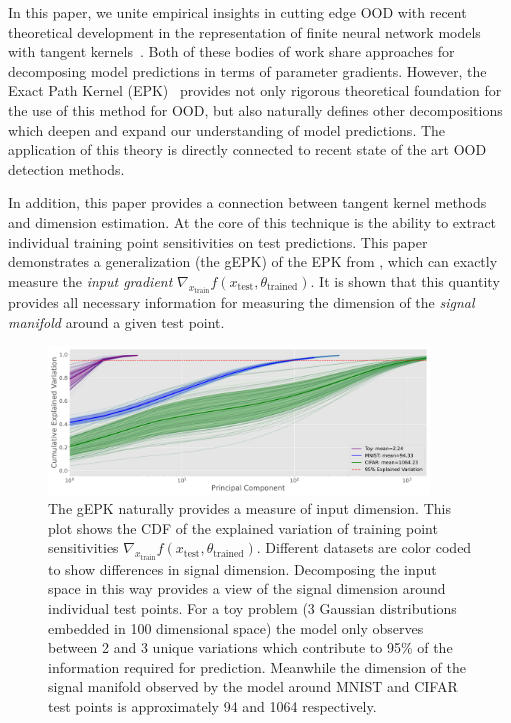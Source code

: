 In this paper, we unite empirical insights in cutting edge OOD with recent theoretical development in the representation of finite neural network models with tangent kernels~\citep{bell2023,chen2021equivalence,domingos2020}. 
Both of these bodies of work share approaches for decomposing model predictions in terms of parameter gradients. 
However, the Exact Path Kernel (EPK)~\citep{bell2023} provides not only rigorous theoretical foundation for the use of this method for OOD, but also naturally defines other decompositions which deepen and expand our understanding of model predictions. The application of this theory is directly connected to recent state of the art OOD detection methods.

In addition, this paper provides a connection between tangent kernel methods and dimension estimation.
At the core of this technique is the ability to extract individual training point sensitivities on test predictions.
This paper demonstrates a generalization (the gEPK) of the EPK from \citet{bell2023},  which can exactly measure the \emph{input gradient} $\nabla_{x_\text{train}}f(x_\text{test}, \theta_\text{trained})$.
It is shown that this quantity provides all necessary information for measuring the dimension of the \textit{signal manifold} \citet{srinivas2023} around a given test point.

\begin{figure}[t]
    \centering
    \includegraphics[width=0.9\textwidth]{c4a_figures/dimensionality_chords.pdf}
    \caption{The gEPK naturally provides a measure of input dimension. This plot shows the CDF of the explained variation of training point sensitivities $\nabla_{x_\text{train}}f(x_\text{test}, \theta_\text{trained})$. Different datasets are color coded to show differences in signal dimension. Decomposing the input space in this way provides a view of the signal dimension around individual test points. For a toy problem (3 Gaussian distributions embedded in 100 dimensional space) the model only observes between 2 and 3 unique variations which contribute to 95\% of the information required for prediction. Meanwhile the dimension of the signal manifold observed by the model around MNIST and CIFAR test points is approximately 94 and 1064 respectively. }
    \label{fig:cdf}
\end{figure}
 
